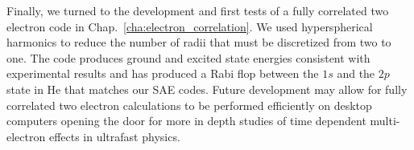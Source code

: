Finally, we turned to the development and first tests of a fully correlated two electron code in Chap.~\ref{cha:electron_correlation}. We used hyperspherical harmonics to reduce the number of radii that must be discretized from two to one. The code produces ground and excited state energies consistent with experimental results and has produced a Rabi flop between the $1s$ and the $2p$ state in He that matches our SAE codes. Future development may allow for fully correlated two electron calculations to be performed efficiently on desktop computers opening the door for more in depth studies of time dependent multi-electron effects in ultrafast physics. 

